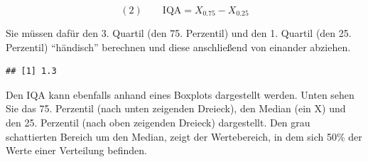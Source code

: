 \documentclass[
  ngerman,
]{book}
\newenvironment{Shaded}{\begin{snugshade}}{\end{snugshade}}
\newcommand{\AttributeTok}[1]{\textcolor[rgb]{0.13,0.29,0.53}{#1}}
\newcommand{\CommentTok}[1]{\textcolor[rgb]{0.56,0.35,0.01}{\textit{#1}}}
\newcommand{\DecValTok}[1]{\textcolor[rgb]{0.00,0.00,0.81}{#1}}
\newcommand{\FloatTok}[1]{\textcolor[rgb]{0.00,0.00,0.81}{#1}}
\newcommand{\FunctionTok}[1]{\textcolor[rgb]{0.13,0.29,0.53}{\textbf{#1}}}
\newcommand{\NormalTok}[1]{#1}
\newcommand{\SpecialCharTok}[1]{\textcolor[rgb]{0.81,0.36,0.00}{\textbf{#1}}}
\newcommand{\StringTok}[1]{\textcolor[rgb]{0.31,0.60,0.02}{#1}}
\begin{document}
\[
(2)\qquad \mathrm{IQA} = X_{0.75} - X_{0.25}
\]

Sie müssen dafür den 3. Quartil (den 75. Perzentil) und den 1. Quartil (den 25. Perzentil) ``händisch'' berechnen und diese anschließend von einander abziehen.

\begin{Shaded}
\end{Shaded}

\begin{verbatim}
## [1] 1.3
\end{verbatim}

Den IQA kann ebenfalls anhand eines Boxplots dargestellt werden. Unten sehen
Sie das 75. Perzentil (nach unten zeigenden Dreieck), den Median (ein X) und den 25. Perzentil
(nach oben zeigenden Dreieck) dargestellt. Den grau schattierten Bereich um den Median, zeigt
der Wertebereich, in dem sich 50\% der Werte einer Verteilung befinden.

\begin{Shaded}
\end{Shaded}
\end{document}
